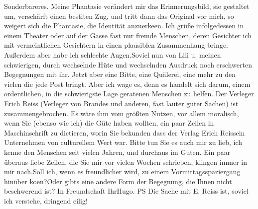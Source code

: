 \begin{ledgroupsized}[t]{13cm}
               Sonderbareres. Meine Phantasie verändert mir das Erinnerungsbild, sie gestaltet um,
               verschärft einen besti{\geminationm}ten Zug, und tritt dann das
               Original vor mich, so weigert sich die Phantasie, die Identität anzuerke{\geminationn}en. Ich grüße infolgedessen in einem Theater oder auf
               der Gasse fast nur fremde Menschen, deren Gesichter ich mit vermeintlichen Gesichtern
               in einen plausiblen {\pb}Zusammenhang
               bringe. Außerdem aber habe ich schlechte Augen.\hspace*{1.5em}Soviel nun von Lili u. meinen schwierigen,
               durch wechselnde Hüte und wechselnden Ausdruck noch erschwerten Begegnungen mit ihr.
               Jetzt aber eine Bitte, eine Quälerei, eine mehr zu den vielen die jede Post bringt.
               Aber ich wage es, denn es handelt sich darum, einem ordentlichen, in die schwierigste
               Lage geratenen Menschen zu helfen. Der Verleger Erich Reiss (Verleger von Brandes und
               anderen, fast lauter guter Sachen) ist zusammengebrochen. Es wäre ihm vom größten
               Nutzen, vor allem moralisch, wenn Sie (ebenso wie ich) die Güte haben wollten, ein
               paar Zeilen in Maschinschrift zu dictieren, worin Sie bekunden dass der Verlag Erich Reissein Unternehmen von culturellem
               Wert war.\pend
           \pstart
           Bitte tun Sie es auch mir zu lieb, ich kenne den Menschen seit vielen Jahren, und
               durchaus im Guten.\pend
           \pstart
           Ein paar überaus liebe Zeilen, die Sie mir vor vielen Wochen schrieben, klingen immer
               in mir nach.\hspace*{1.5em}Soll ich, wenn es freundlicher wird, zu
               einem Vormittagsspaziergang hinüber ko{\geminationm}en?\hspace*{1.5em}Oder gibts eine andere Form der Begegnung, die Ihnen
               nicht beschwerend ist? \pend
           \pstart In Freundschaft Ihr\spacefill\mbox{Hugo.}\pend{}\pstart
           \noindent{}PS Die Sache mit E. Reiss ist, soviel ich
                  verstehe, dringend eilig!\pend
           
         
         \endnumbering{}\end{ledgroupsized}  \newcommand{\dateiname}{L02466}\newcommand{\titel}{Hugo Hofmannsthal an Arthur Schnitzler, 9. 3. [1926]}\newcommand{\editorInnen}{Martin Anton Müller und Gerd-Hermann Susen}
      